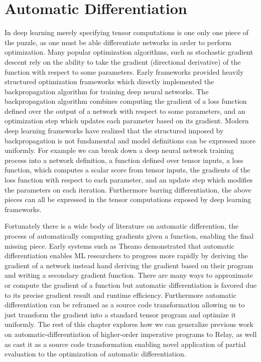 \chapter{Automatic Differentiation}
\label{ch:ad}

In deep learning merely specifying tensor computations is
  one only one piece of the puzzle, as one must be able
  differentiate networks in order to perform optimization.
Many popular optimization algorithms,
  such as stochastic gradient descent
  rely on the ability to take
  the gradient (directional derivative) of the function with
  respect to some parameters.
Early frameworks provided heavily structured optimization frameworks
  which directly implemented the backpropagation algorithm for training
  deep neural networks.
The backpropagation algorithm combines
  computing the gradient of a loss function defined over the
  output of a network with respect to some parameters, and an
  optimization step which updates each parameter based on its
  gradient.
Modern deep learning frameworks have realized that the
  structured imposed by backpropagation is not fundamental
  and model definitions can be expressed more uniformly.
For example we can break down a deep neural network training
  process into a network definition, a function defined over tensor inputs,
  a loss function, which computes a scalar score from tensor
  inputs, the gradients of the loss function with respect to each parameter,
  and an update step which modifies the parameters on each iteration.
Furthermore barring differentiation, the above pieces can all be expressed
  in the tensor computations exposed by deep learning frameworks.

Fortunately there is a wide body of literature on automatic differention,
  the process of automatically computing gradients given a function,
  enabling the final missing piece.
Early systems such as Theano demonstrated that automatic
  differentiation enables ML researchers to progress more rapidly
  by deriving the gradient of a network instead hand deriving
  the gradient based on their program and writing a secondary gradient function.
There are many ways to approximate or compute the gradient of a function
  but automatic differentiation is favored due to its precise gradient
  result and runtime efficiency.
Furthermore automatic differentiation can be reframed as a source
  code transformation allowing us to just transform the gradient
  into a standard tensor program and optimize it uniformly.
The rest of this chapter explores how we can generalize previous
  work on automatic-differentiation of higher-order imperative programs
  to Relay, as well as cast it as a source code transformation enabling
  novel application of partial evaluation to the optimization of automatic
  differentiation.

